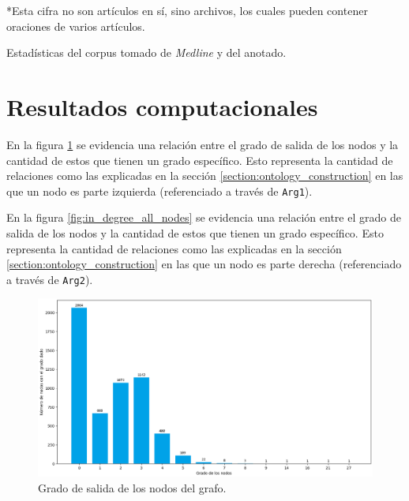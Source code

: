 \begin{table}[H]
\begin{center}
		\vspace{-0.1in}
		*\small{Esta cifra no son artículos en sí, sino archivos, los cuales pueden contener oraciones de varios artículos.}
		\caption[Estadísticas del corpus tomado de \textit{Medline} y del anotado]{Estadísticas del corpus tomado de \textit{Medline} y del anotado.}
		\label{tab:stats_corpus}
	\end{center}
\end{table}

\vspace{-0.3in}
\section{Resultados computacionales}
En la figura \ref{fig:out_degree_all_nodes} se evidencia una relación entre el grado de salida de los nodos y la cantidad de estos que tienen un grado específico. Esto representa la cantidad de relaciones como las explicadas en la sección \ref{section:ontology_construction} en las que un nodo es parte izquierda (referenciado a través de \texttt{Arg1}).

En la figura \ref{fig:in_degree_all_nodes} se evidencia una relación entre el grado de salida de los nodos y la cantidad de estos que tienen un grado específico. Esto representa la cantidad de relaciones como las explicadas en la sección \ref{section:ontology_construction} en las que un nodo es parte derecha (referenciado a través de \texttt{Arg2}).

\begin{figure}[H]
	\begin{center}
		\includegraphics[width=\textwidth]{graphics/degree1.png}
		\caption[Grado de salida de los nodos del grafo]{Grado de salida de los nodos del grafo.}
		\label{fig:out_degree_all_nodes}
	\end{center}
\end{figure}

